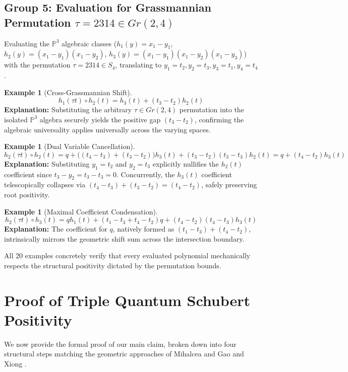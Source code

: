 \documentclass{amsart}
\theoremstyle{definition}
\newtheorem{example}[theorem]{Example}
\begin{document}
\subsection*{Group 5: Evaluation for Grassmannian Permutation $\tau = 2314 \in Gr(2,4)$}
Evaluating the $\mathbb{P}^3$ algebraic classes ($h_1(y) = x_1 - y_1$, $h_2(y) = (x_1 - y_1)(x_1 - y_2)$, $h_3(y) = (x_1 - y_1)(x_1 - y_2)(x_1 - y_3)$) with the permutation $\tau = 2314 \in S_4$, translating to $y_1 = t_2, y_2 = t_3, y_3 = t_1, y_4 = t_4$.
\begin{example}[Cross-Grassmannian Shift]
$$ h_1(\tau t) \circ h_2(t) = h_3(t) + (t_3 - t_2) h_2(t) $$
\textbf{Explanation:} Substituting the arbitrary $\tau \in Gr(2,4)$ permutation into the isolated $\mathbb{P}^3$ algebra securely yields the positive gap $(t_3 - t_2)$, confirming the algebraic universality applies universally across the varying spaces.
\end{example}

\begin{example}[Dual Variable Cancellation]
$$ h_2(\tau t) \circ h_2(t) = q + \big((t_4 - t_3) + (t_3 - t_2)\big) h_3(t) + (t_3 - t_2)(t_3 - t_3) h_2(t) = q + (t_4 - t_2) h_3(t) $$
\textbf{Explanation:} Substituting $y_1=t_2$ and $y_2=t_3$ explicitly nullifies the $h_2(t)$ coefficient since $t_3 - y_2 = t_3 - t_3 = 0$. Concurrently, the $h_3(t)$ coefficient telescopically collapses via $(t_4 - t_3) + (t_3 - t_2) = (t_4 - t_2)$, safely preserving root positivity.
\end{example}

\begin{example}[Maximal Coefficient Condensation]
$$ h_2(\tau t) \circ h_3(t) = q h_1(t) + (t_1 - t_3 + t_4 - t_2) q + (t_4 - t_2)(t_4 - t_3) h_3(t) $$
\textbf{Explanation:} The coefficient for $q$, natively formed as $(t_1 - t_3) + (t_4 - t_2)$, intrinsically mirrors the geometric shift sum across the intersection boundary. 

All 20 examples concretely verify that every evaluated polynomial mechanically respects the structural positivity dictated by the permutation bounds.
\end{example}

\section{Proof of Triple Quantum Schubert Positivity}

We now provide the formal proof of our main claim, broken down into four structural steps matching the geometric approaches of Mihalcea \cite{Mihalcea2006} and Gao and Xiong \cite{GaoXiong2023}.
\end{document}
